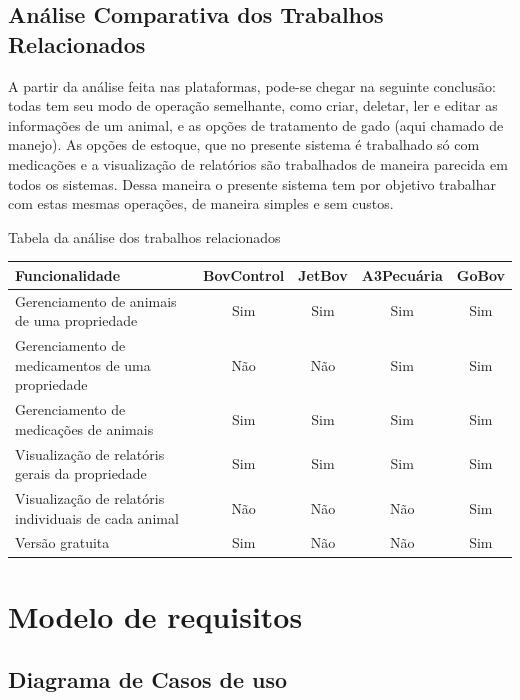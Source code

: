 \documentclass[12pt]{article}
\begin{document}

	\subsection{Análise Comparativa dos Trabalhos Relacionados}

	A partir da análise feita nas plataformas, pode-se chegar na seguinte conclusão: todas tem seu modo de operação semelhante, como criar, deletar, ler e editar as informações de um animal, e as opções de tratamento de gado (aqui chamado de manejo). As opções de estoque, que no presente sistema é trabalhado só com medicações e a visualização de relatórios são trabalhados de maneira parecida em todos os sistemas. Dessa maneira o presente sistema tem por objetivo trabalhar com estas mesmas operações, de maneira simples e sem custos.

	\begin{center}
		\caption{Tabela da análise dos trabalhos relacionados}
		\begin{tabular}{ | p{8cm} |  c | c | c | c |}
			\hline
			Funcionalidade & BovControl & JetBov & A3Pecuária & GoBov \\ \hline
			Gerenciamento de animais de uma propriedade & Sim & Sim & Sim & Sim \\  \hline
			Gerenciamento de medicamentos de uma propriedade & Não & Não & Sim & Sim  \\ \hline
			Gerenciamento de medicações de animais & Sim & Sim & Sim & Sim  \\ \hline
			Visualização de relatóris gerais da propriedade & Sim & Sim & Sim & Sim  \\ \hline
			Visualização de relatóris individuais de cada animal & Não & Não & Não & Sim  \\ \hline
			Versão gratuita & Sim & Não & Não & Sim  \\
			\hline
		\end{tabular}
	\end{center}

	\newpage

	\section{Modelo de requisitos}

	\subsection{Diagrama de Casos de uso}
\end{document}
